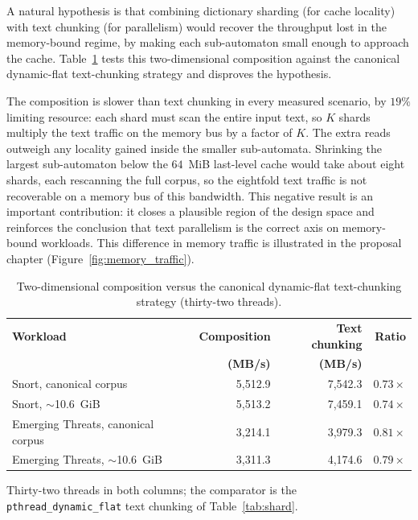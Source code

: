 
A natural hypothesis is that combining dictionary sharding (for cache locality)
with text chunking (for parallelism) would recover the throughput lost in the
memory-bound regime, by making each sub-automaton small enough to approach the
cache. Table~\ref{tab:twod} tests this two-dimensional composition against the
canonical dynamic-flat text-chunking strategy and disproves the hypothesis.

The composition is slower than text chunking in every measured scenario, by
$19\%$
limiting resource: each shard must scan the entire input text, so $K$ shards
multiply the text traffic on the memory bus by a factor of $K$. The extra reads
outweigh any locality gained inside the smaller sub-automata. Shrinking the largest
sub-automaton below the $64$~MiB last-level cache would take about eight shards,
each rescanning the full corpus, so the eightfold text traffic is not recoverable
on a memory bus of this bandwidth. This negative result is an important
contribution: it closes a plausible region of the design space and reinforces the
conclusion that text parallelism is the correct axis on memory-bound workloads.
This difference in memory traffic is illustrated in the proposal chapter
(Figure~\ref{fig:memory_traffic}).

\begin{table}[H]
    \centering
    \caption{Two-dimensional composition versus the canonical dynamic-flat text-chunking strategy (thirty-two threads).}
    \label{tab:twod}
    \small
    \begin{tabular}{@{} l r r r @{}}
        \toprule
        \textbf{Workload} & \textbf{Composition} & \textbf{Text chunking} & \textbf{Ratio} \\
         & \textbf{(MB/s)} & \textbf{(MB/s)} & \\
        \midrule
        Snort, canonical corpus              & 5{,}512.9 & 7{,}542.3 & $0.73\times$ \\ \addlinespace
        Snort, $\sim$10.6~GiB                & 5{,}513.2 & 7{,}459.1 & $0.74\times$ \\ \addlinespace
        Emerging Threats, canonical corpus   & 3{,}214.1 & 3{,}979.3 & $0.81\times$ \\ \addlinespace
        Emerging Threats, $\sim$10.6~GiB     & 3{,}311.3 & 4{,}174.6 & $0.79\times$ \\
        \bottomrule
    \end{tabular}

    {\footnotesize\raggedright Thirty-two threads in both columns; the comparator is the \texttt{pthread\_dynamic\_flat} text chunking of Table~\ref{tab:shard}.\par}
\end{table}

